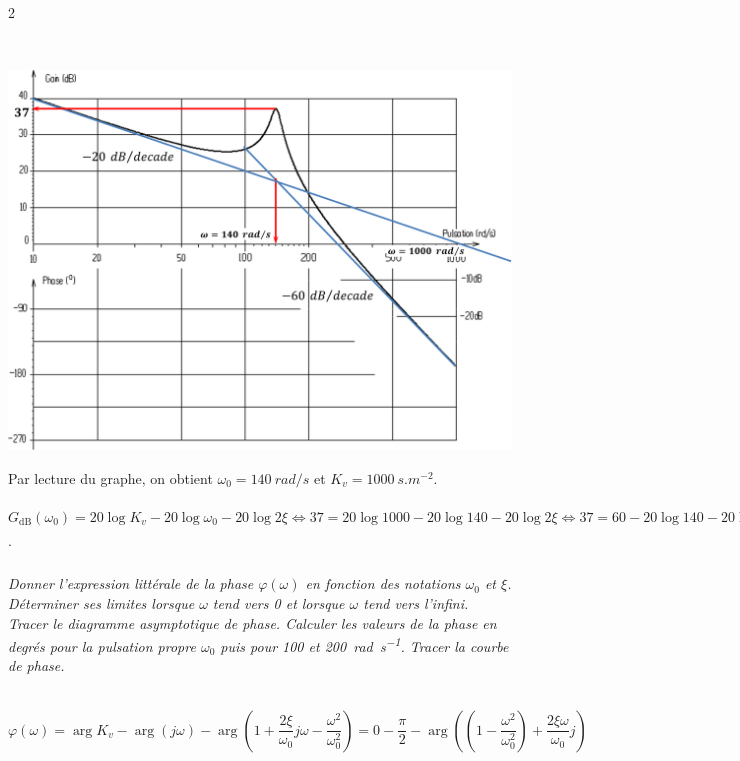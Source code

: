 \documentclass[10pt,fleqn]{article} %
\begin{document}
\begin{multicols}{2}
\ifprof \begin{corrige}~\\

\begin{center}
\includegraphics[width=\linewidth]{images/cor_01}
\end{center}
Par lecture du graphe, on obtient $\omega_0=\SI{140}{rad/s}$ et $K_v=\SI{1000}{s.m^{-2}}$.

$G_{\text{dB}}\left(\omega_0 \right)=
20\log K_v- 20\log  \omega_0 - 20\log 2\xi 
\Leftrightarrow 37=20\log 1000 - 20\log  140 - 20\log 2\xi
\Leftrightarrow 37=60 - 20\log  140 - 20\log 2\xi
\Leftrightarrow \dfrac{37-60 + 20\log  140}{-20} =\log 2\xi
\Leftrightarrow  \xi \simeq 0,05
$.

\end{corrige} \else \fi


\subparagraph{}\textit{Donner l'expression littérale de la phase $\varphi(\omega)$ en fonction des notations $\omega_0$ et $\xi$.	
Déterminer ses limites lorsque $\omega$ tend vers 0 et lorsque $\omega$ tend vers l'infini.	
Tracer le diagramme asymptotique de phase.	
Calculer les valeurs de la phase en degrés pour la pulsation propre $\omega_0$ puis pour \num{100} et \SI{200}{rad.s^{-1}}. Tracer la courbe de phase.}

\ifprof \begin{corrige} ~\\

$
\varphi\left(  \omega\right)
=\arg K_v- \arg \left( j\omega\right) - \arg  \left( 1+\dfrac{2\xi}{\omega_0} j\omega - \dfrac{\omega^2}{\omega_0^2}  \right)
=0-\dfrac{\pi}{2} - \arg  \left( \left( 1 - \dfrac{\omega^2}{\omega_0^2}\right) + \dfrac{2\xi\omega}{\omega_0} j \right)
$


\end{corrige}
\end{multicols}
\end{document}
